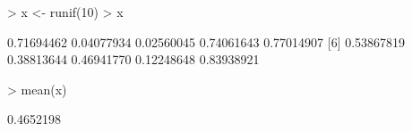 \begin{Schunk}
\begin{Sinput}
> x <- runif(10)
> x
\end{Sinput}
\begin{Soutput}
 [1] 0.71694462 0.04077934 0.02560045 0.74061643 0.77014907
 [6] 0.53867819 0.38813644 0.46941770 0.12248648 0.83938921
\end{Soutput}
\begin{Sinput}
> mean(x)
\end{Sinput}
\begin{Soutput}
[1] 0.4652198
\end{Soutput}
\end{Schunk}
